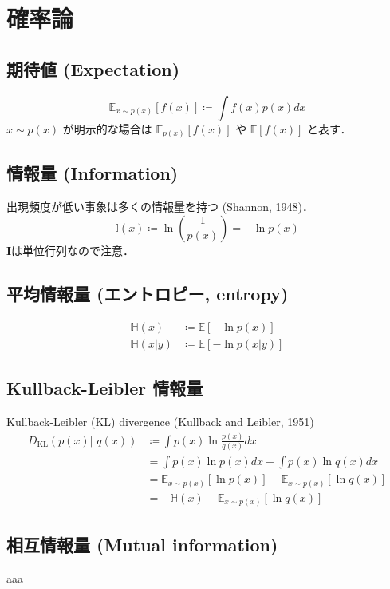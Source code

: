 \section{確率論}
\subsection{期待値 (Expectation)}
\begin{equation}
\mathbb{E}_{x\sim p(x)}\left[f(x)\right]\coloneqq \int f(x)p(x)dx
\end{equation}
$x\sim p(x)$ が明示的な場合は $\mathbb{E}_{p(x)}\left[f(x)\right]$ や $\mathbb{E}\left[f(x)\right]$ と表す．
\subsection{情報量 (Information)}
出現頻度が低い事象は多くの情報量を持つ (Shannon, 1948)．
\begin{equation}
\mathbb{I}(x)\coloneqq \ln\left(\frac{1}{p(x)}\right)=-\ln p(x)
\end{equation}
$\mathbf{I}$は単位行列なので注意．
\subsection{平均情報量 (エントロピー, entropy)}
\begin{align}
\mathbb{H}(x)&\coloneqq \mathbb{E}[-\ln p(x)]\\
\mathbb{H}(x\vert y)&\coloneqq \mathbb{E}[-\ln p(x\vert y)]
\end{align}
\subsection{Kullback-Leibler 情報量}
Kullback-Leibler (KL) divergence (Kullback and Leibler, 1951)
\begin{align}
D_{\text{KL}}\left(p(x) \Vert\ q(x)\right)&\coloneqq \int p(x) \ln \frac{p(x)}{q(x)} dx\\
&=\int p(x) \ln p(x) dx-\int p(x) \ln q(x) dx\\
&=\mathbb{E}_{x\sim p(x)}[\ln p(x)]-\mathbb{E}_{x\sim p(x)}[\ln q(x)]\\
&=-\mathbb{H}(x)-\mathbb{E}_{x\sim p(x)}[\ln q(x)]
\end{align}
\subsection{相互情報量 (Mutual information)}
aaa
